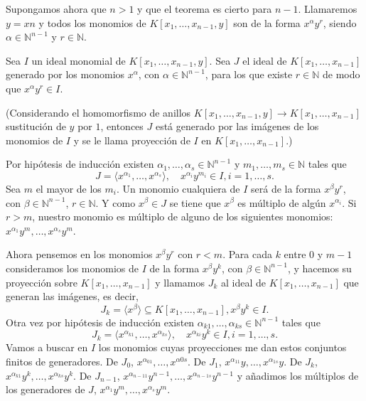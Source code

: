 \documentclass[12pt]{article}
\begin{document}
Supongamos ahora que $n>1$ y que el teorema es cierto para $n-1$. Llamaremos $y = xn$ y todos los monomios de $K[x_1, \ldots, x_{n-1},y]$ son de la forma $x^\alpha y^r$, siendo $\alpha \in \mathbb{N}^{n-1}$ y $r \in \mathbb{N}$.

Sea $I$ un ideal monomial de $K[x_1, \ldots, x_{n-1},y]$. Sea $J$ el ideal de $K[x_1, \ldots, x_{n-1}]$ generado por los monomios $x^\alpha$, con $\alpha \in \mathbb{N}^{n-1}$, para los que existe $r \in \mathbb{N}$ de modo que $x^\alpha y^r \in I$. 

(Considerando el homomorfismo de anillos $K[x_1, \ldots, x_{n-1},y] \longrightarrow K[x_1, \ldots, x_{n-1}]$ sustitución de $y$ por $1$, entonces $J$ está generado por las imágenes de los monomios de $I$ y se le llama proyección de $I$ en $K[x_1, \ldots, x_{n-1}]$.)

Por hipótesis de inducción existen $\alpha_1, \ldots, \alpha_s \in \mathbb{N}^{n-1}$ y $m_1, \ldots, m_s \in \mathbb{N}$ tales que $$J = \langle x^{\alpha_1}, \ldots, x^{\alpha_s} \rangle, \quad x^{\alpha_i}y^{m_i} \in I, i=1, \ldots, s.$$ Sea $m$ el mayor de los $m_i$. Un monomio cualquiera de $I$ será de la forma $x^\beta y^r$, con $\beta \in \mathbb{N}^{n-1}$, $r\in \mathbb{N}$. Y como $x^\beta \in J$ se tiene que $x^\beta$ es múltiplo de algún $x^{\alpha_i}$. Si $r> m$, nuestro monomio es múltiplo de alguno de los siguientes monomios: $x^{\alpha_1}y^m, \ldots, x^{\alpha_s}y^m$. 

Ahora pensemos en los monomios $x^\beta y^r$ con $r<m$. Para cada $k$ entre $0$ y $m-1$ consideramos los monomios de $I$ de la forma $x^\beta y^k$, con $\beta \in \mathbb{N}^{n-1}$, y hacemos su proyección sobre $K[x_1, \ldots, x_{n-1}]$ y llamamos $J_k$ al ideal de $K[x_1, \ldots, x_{n-1}]$ que generan las imágenes, es decir, $$J_k = \langle x^\beta \rangle \subseteq K[x_1, \ldots, x_{n-1}], x^\beta y^k \in I.$$ Otra vez por hipótesis de inducción existen $\alpha_{k1}, \ldots, \alpha_{ks} \in \mathbb{N}^{n-1}$ tales que $$J_k = \langle x ^{\alpha_{k1}}, \ldots, x^{\alpha_{ks}} \rangle, \quad x^{\alpha_{ki}}y^k \in I, i=1, \ldots, s.$$ Vamos a buscar en $I$ los monomios cuyas proyecciones me dan estos conjuntos finitos de generadores. De $J_0$, $x^{\alpha_{01}}, \ldots, x^{\alpha{0s}}$. De $J_1$, $x^{\alpha_{11}}y, \ldots, x^{\alpha_{1s}}y$. De $J_k$, $x^{\alpha_{k1}}y^k, \ldots, x^{\alpha_{ks}}y^k$. De $J_{n-1}$, $x^{\alpha_{n-11}}y^{n-1}, \ldots, x^{\alpha_{n-1s}}y^{n-1}$ y añadimos los múltiplos de los generadores de $J$, $x^{\alpha_1}y^m, \ldots, x^{\alpha_s}y^m$. 
\end{document}
